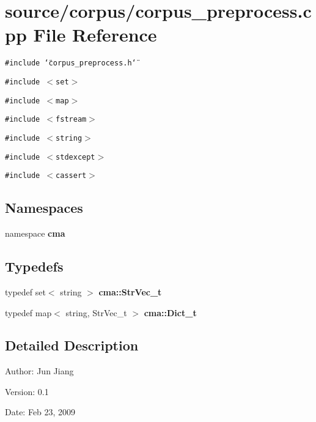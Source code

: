 \section{source/corpus/corpus\_\-preprocess.cpp File Reference}
\label{corpus__preprocess_8cpp}
{\tt \#include \char`\"{}corpus\_\-preprocess.h\char`\"{}}\par
{\tt \#include $<$set$>$}\par
{\tt \#include $<$map$>$}\par
{\tt \#include $<$fstream$>$}\par
{\tt \#include $<$string$>$}\par
{\tt \#include $<$stdexcept$>$}\par
{\tt \#include $<$cassert$>$}\par
\subsection*{Namespaces}
\begin{CompactItemize}
\item 
namespace \textbf{cma}
\end{CompactItemize}
\subsection*{Typedefs}
\begin{CompactItemize}
\item 
typedef set$<$ string $>$ \textbf{cma::StrVec\_\-t}\label{namespacecma_cefb2db87c7c07c3d62e5b4a86a052cf}

\item 
typedef map$<$ string, StrVec\_\-t $>$ \textbf{cma::Dict\_\-t}\label{namespacecma_873ab223ed2ee50446a7fd8294dcf04e}

\end{CompactItemize}


\subsection{Detailed Description}
\begin{Desc}
\item[Author:]Jun Jiang \end{Desc}
\begin{Desc}
\item[Version:]0.1 \end{Desc}
\begin{Desc}
\item[Date:]Feb 23, 2009 \end{Desc}
